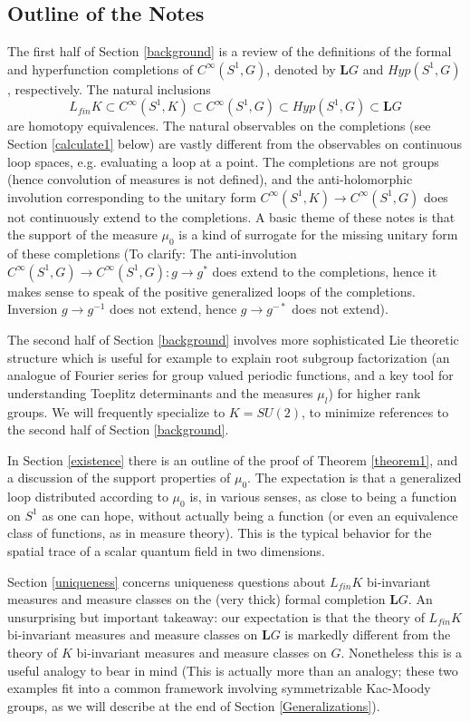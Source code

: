 \documentclass{amsart}
\theoremstyle{conjecture}
\theoremstyle{definition}
\theoremstyle{question}
\theoremstyle{questions}
\theoremstyle{remark}
\theoremstyle{remarks}
\theoremstyle{example}
\numberwithin{equation}{section}
\begin{document}
\subsection{ Outline of the Notes}

The first half of Section \ref{background} is a review of the definitions of the formal and hyperfunction completions of $C^{\infty}(S^1,G)$, denoted by $\mathbf L G$ and $Hyp(S^1,G)$, respectively. The natural inclusions
$$L_{fin}K \subset C^{\infty}(S^1,K) \subset C^{\infty}(S^1,G)\subset Hyp(S^1,G)\subset \mathbf L G$$
are homotopy equivalences. The natural observables on the completions (see Section \ref{calculate1} below) are vastly different from the observables on continuous loop spaces, e.g. evaluating a  loop at a point. The completions are not groups (hence convolution of measures is not defined), and the anti-holomorphic involution corresponding to the unitary form $C^{\infty}(S^1,K)\to C^{\infty}(S^1,G)$ does not continuously extend to the completions. A basic theme of these notes is that the support of the measure $\mu_0$ is a kind of surrogate for the missing unitary form of these completions (To clarify: The anti-involution $C^{\infty}(S^1,G)\to C^{\infty}(S^1,G):g \to g^*$ does extend to the completions, hence it makes sense to speak of the positive generalized loops of the completions. Inversion $g\to g^{-1}$ does not extend, hence $g\to g^{-*}$ does not extend). 

The second half of Section \ref{background} involves more sophisticated Lie theoretic structure which is useful for example to explain root subgroup factorization (an analogue of Fourier series for group valued periodic functions, and a key tool for understanding Toeplitz determinants and the measures $\mu_l$) for higher rank groups. We will frequently specialize to $K=SU(2)$, to minimize references to the second half of Section \ref{background}.

In Section \ref{existence} there is an outline of the proof of Theorem \ref{theorem1}, and a discussion of the support properties of $\mu_0$. The expectation is that a generalized loop distributed according to $\mu_0$ is, in various senses, as close to being a function on $S^1$ as one can hope, without actually being a function (or even an equivalence class of functions, as in measure theory). This is the typical behavior for the spatial trace of a scalar quantum field in two dimensions.

Section \ref{uniqueness} concerns uniqueness questions about $L_{fin}K$ bi-invariant measures and measure classes on the (very thick) formal completion $\mathbf L G$. An unsurprising but important takeaway: our expectation is that the theory of $L_{fin}K$ bi-invariant measures and measure classes on $\mathbf L G$ is markedly different from the theory of $K$ bi-invariant measures and measure classes on $G$. Nonetheless this is a useful analogy to bear in mind (This is actually more than an analogy; these two examples fit into a common framework involving symmetrizable Kac-Moody groups, as we will describe at the end of Section \ref{Generalizations}).
\end{document}
